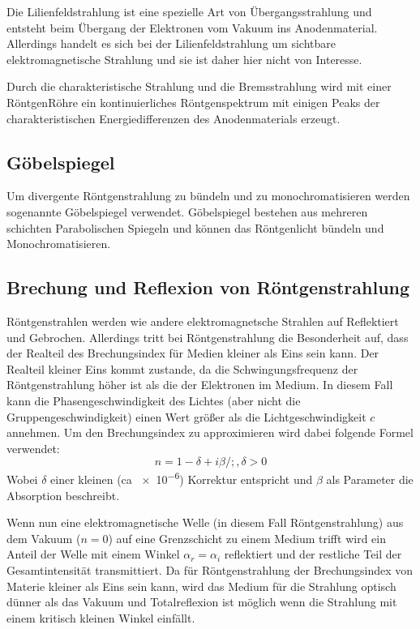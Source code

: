         Die Lilienfeldstrahlung ist eine spezielle Art von Übergangsstrahlung und entsteht beim Übergang der Elektronen vom Vakuum ins Anodenmaterial. Allerdings handelt es sich bei der Lilienfeldstrahlung um sichtbare elektromagnetische Strahlung und sie ist daher hier nicht von Interesse.

        Durch die charakteristische Strahlung und die Bremsstrahlung wird mit einer RöntgenRöhre ein kontinuierliches Röntgenspektrum mit einigen Peaks der charakteristischen Energiedifferenzen des Anodenmaterials erzeugt.
    \subsection{Göbelspiegel}
        Um divergente Röntgenstrahlung zu bündeln und zu monochromatisieren werden sogenannte Göbelspiegel verwendet.
        Göbelspiegel bestehen aus mehreren schichten Parabolischen Spiegeln und können das Röntgenlicht bündeln und Monochromatisieren.
    \subsection{Brechung und Reflexion von Röntgenstrahlung}
        Röntgenstrahlen werden wie andere elektromagnetsche Strahlen auf Reflektiert und Gebrochen.
        Allerdings tritt bei Röntgenstrahlung die Besonderheit auf, dass der Realteil des Brechungsindex für Medien kleiner als Eins sein kann.
        Der Realteil kleiner Eins kommt zustande, da die Schwingungsfrequenz der Röntgenstrahlung höher ist als die der Elektronen im Medium.
        In diesem Fall kann die Phasengeschwindigkeit des Lichtes (aber nicht die Gruppengeschwindigkeit) einen Wert größer als die Lichtgeschwindigkeit $c$ annehmen.
        Um den Brechungsindex zu approximieren wird dabei folgende Formel verwendet:
        \begin{equation}
            n = 1-\delta+i\beta /; , \delta > 0
        \end{equation}
        Wobei $\delta$ einer kleinen (ca \num{e-6}) Korrektur entspricht und $\beta$ als Parameter die Absorption beschreibt.
        
        Wenn nun eine elektromagnetische Welle (in diesem Fall Röntgenstrahlung) aus dem Vakuum ($n = 0$) auf eine Grenzschicht zu einem Medium trifft wird ein Anteil der Welle mit einem Winkel $\alpha_r = \alpha_i$ reflektiert und der restliche Teil der Gesamtintensität transmittiert.
        Da für Röntgenstrahlung der Brechungsindex von Materie kleiner als Eins sein kann, wird das Medium für die Strahlung optisch dünner als das Vakuum und Totalreflexion ist möglich wenn die Strahlung mit einem kritisch kleinen Winkel einfällt.

